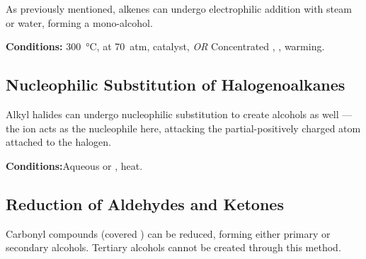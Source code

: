			As previously mentioned, alkenes can undergo electrophilic addition with steam or water, forming a mono-alcohol.


			\vspace{1.5em}
			\vbox{\textbf{Conditions:}	\tabto{35mm}\SI{300}{\celsius}, at \SI{70}{atm},  catalyst, \textit{OR}
										\tabto{35mm}Concentrated , , warming.}




		\pagebreak
		\subsection{Nucleophilic Substitution of Halogenoalkanes}

			Alkyl halides can undergo nucleophilic substitution to create alcohols as well --- the  ion acts as the
			nucleophile here, attacking the partial-positively charged  atom attached to the halogen.

			\vspace{1.5em}
			\vbox{\textbf{Conditions:}\tabto{35mm}Aqueous  or , heat.}

			\diagram[1.0]{
				\schemestart[0,1.5,thick]
					\chemfig{!\molR-[:0]!\molX}
					\hspace{2mm} + \hspace{2mm}
					\chemfig{!\molOH\mch}
					\arrow
					\chemfig{!\molR-[:0]!\molOH}
					\hspace{2mm} + \hspace{2mm}
					\chemfig{!\molX\mch}
				\schemestop
			}


		\subsection{Reduction of Aldehydes and Ketones}

			Carbonyl compounds (covered \hyperlink{ChapterAldehydesAndKetones}{}) can be reduced, forming either primary or secondary
			alcohols. Tertiary alcohols cannot be created through this method.

